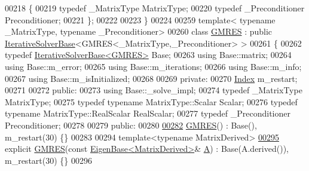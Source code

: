 \begin{DoxyCode}
00218 \{
00219   \textcolor{keyword}{typedef} \_MatrixType MatrixType;
00220   \textcolor{keyword}{typedef} \_Preconditioner Preconditioner;
00221 \};
00222 
00223 \}
00224 
00259 \textcolor{keyword}{template}< \textcolor{keyword}{typename} \_MatrixType, \textcolor{keyword}{typename} \_Preconditioner>
00260 \textcolor{keyword}{class }\hyperlink{group___iterative_linear_solvers___module_class_eigen_1_1_g_m_r_e_s}{GMRES} : \textcolor{keyword}{public} \hyperlink{group___iterative_linear_solvers___module_class_eigen_1_1_iterative_solver_base}{IterativeSolverBase}<GMRES<\_MatrixType,\_Preconditioner> >
00261 \{
00262   \textcolor{keyword}{typedef} \hyperlink{group___iterative_linear_solvers___module_class_eigen_1_1_iterative_solver_base}{IterativeSolverBase<GMRES>} Base;
00263   \textcolor{keyword}{using} Base::matrix;
00264   \textcolor{keyword}{using} Base::m\_error;
00265   \textcolor{keyword}{using} Base::m\_iterations;
00266   \textcolor{keyword}{using} Base::m\_info;
00267   \textcolor{keyword}{using} Base::m\_isInitialized;
00268 
00269 \textcolor{keyword}{private}:
00270   \hyperlink{namespace_eigen_a62e77e0933482dafde8fe197d9a2cfde}{Index} m\_restart;
00271 
00272 \textcolor{keyword}{public}:
00273   \textcolor{keyword}{using} Base::\_solve\_impl;
00274   \textcolor{keyword}{typedef} \_MatrixType MatrixType;
00275   \textcolor{keyword}{typedef} \textcolor{keyword}{typename} MatrixType::Scalar Scalar;
00276   \textcolor{keyword}{typedef} \textcolor{keyword}{typename} MatrixType::RealScalar RealScalar;
00277   \textcolor{keyword}{typedef} \_Preconditioner Preconditioner;
00278 
00279 \textcolor{keyword}{public}:
00280 
\hyperlink{group___iterative_linear_solvers___module_a73153e328dfa402cb3640711289f2985}{00282}   \hyperlink{group___iterative_linear_solvers___module_a73153e328dfa402cb3640711289f2985}{GMRES}() : Base(), m\_restart(30) \{\}
00283 
00294   \textcolor{keyword}{template}<\textcolor{keyword}{typename} MatrixDerived>
\hyperlink{group___iterative_linear_solvers___module_a9ceeeb826c7e60ee948c0d1c0a219607}{00295}   \textcolor{keyword}{explicit} \hyperlink{group___iterative_linear_solvers___module_a9ceeeb826c7e60ee948c0d1c0a219607}{GMRES}(\textcolor{keyword}{const} \hyperlink{group___core___module_struct_eigen_1_1_eigen_base}{EigenBase<MatrixDerived>}& \hyperlink{group___core___module_class_eigen_1_1_matrix}{A}) : Base(A.derived()), 
      m\_restart(30) \{\}
00296 

\end{DoxyCode}
